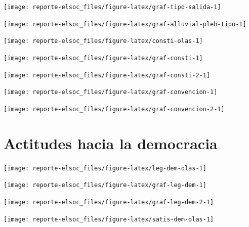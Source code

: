 \documentclass[
  12pt,
]{book}
\begin{document}
\begin{center}\texttt{[image: reporte-elsoc\_files/figure-latex/graf-tipo-salida-1]} \end{center}

\begin{center}\texttt{[image: reporte-elsoc\_files/figure-latex/graf-alluvial-pleb-tipo-1]} \end{center}

\begin{center}\texttt{[image: reporte-elsoc\_files/figure-latex/consti-olas-1]} \end{center}

\begin{center}\texttt{[image: reporte-elsoc\_files/figure-latex/graf-consti-1]} \end{center}

\begin{center}\texttt{[image: reporte-elsoc\_files/figure-latex/graf-consti-2-1]} \end{center}

\begin{center}\texttt{[image: reporte-elsoc\_files/figure-latex/graf-convencion-1]} \end{center}

\begin{center}\texttt{[image: reporte-elsoc\_files/figure-latex/graf-convencion-2-1]} \end{center}

\hypertarget{actitudes-hacia-la-democracia}{%
\section{Actitudes hacia la democracia}\label{actitudes-hacia-la-democracia}}

\begin{center}\texttt{[image: reporte-elsoc\_files/figure-latex/leg-dem-olas-1]} \end{center}

\begin{center}\texttt{[image: reporte-elsoc\_files/figure-latex/graf-leg-dem-1]} \end{center}

\begin{center}\texttt{[image: reporte-elsoc\_files/figure-latex/graf-leg-dem-2-1]} \end{center}

\begin{center}\texttt{[image: reporte-elsoc\_files/figure-latex/satis-dem-olas-1]} \end{center}
\end{document}
